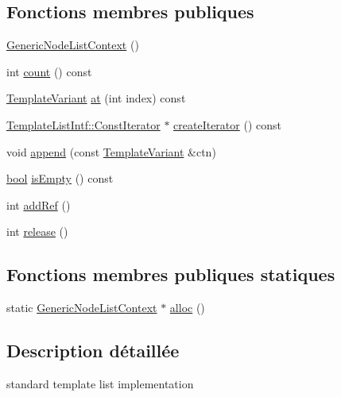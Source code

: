 \subsection*{Fonctions membres publiques}
\begin{DoxyCompactItemize}
\item 
\hyperlink{class_generic_node_list_context_aeed491b9d2c4e8bde465e0b9789425ce}{Generic\+Node\+List\+Context} ()
\item 
int \hyperlink{class_generic_node_list_context_aa55fd96b47a514755891b0e1416221c2}{count} () const 
\item 
\hyperlink{class_template_variant}{Template\+Variant} \hyperlink{class_generic_node_list_context_ac299be6a9de3b8efee44dfec785ea635}{at} (int index) const 
\item 
\hyperlink{class_template_list_intf_1_1_const_iterator}{Template\+List\+Intf\+::\+Const\+Iterator} $\ast$ \hyperlink{class_generic_node_list_context_ad5dc62ee44c343deb7c8fa499e89d5c0}{create\+Iterator} () const 
\item 
void \hyperlink{class_generic_node_list_context_a1e3defa7bc050ae33e2fbabba7a20643}{append} (const \hyperlink{class_template_variant}{Template\+Variant} \&ctn)
\item 
\hyperlink{qglobal_8h_a1062901a7428fdd9c7f180f5e01ea056}{bool} \hyperlink{class_generic_node_list_context_aba497096aa3018f805f6f45c728d0921}{is\+Empty} () const 
\item 
int \hyperlink{class_generic_node_list_context_a8c165d6443a3f2522cd6a871ce45ebc4}{add\+Ref} ()
\item 
int \hyperlink{class_generic_node_list_context_a0aa1daa5e593ca8326d05a9028759750}{release} ()
\end{DoxyCompactItemize}
\subsection*{Fonctions membres publiques statiques}
\begin{DoxyCompactItemize}
\item 
static \hyperlink{class_generic_node_list_context}{Generic\+Node\+List\+Context} $\ast$ \hyperlink{class_generic_node_list_context_a2784ae62d12218fae2007069afafbaec}{alloc} ()
\end{DoxyCompactItemize}


\subsection{Description détaillée}
standard template list implementation 

